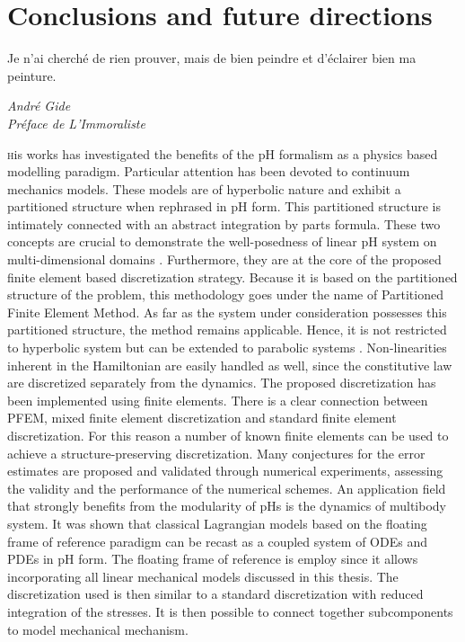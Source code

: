 \chapter*{Conclusions and future directions}

\epigraph{Je n’ai cherché de rien prouver, mais de bien peindre et d’éclairer bien ma peinture.}{\textit{André Gide \\ Préface de L'Immoraliste}}

\lettrine{\color{theme}{T}}his works has investigated the benefits of the pH formalism as a physics based modelling paradigm. Particular attention has been devoted to continuum mechanics models. These models are of hyperbolic nature and exhibit a partitioned structure when rephrased in  pH form. This partitioned structure is intimately connected with an abstract integration by parts formula. These two concepts are crucial to demonstrate the well-posedness of linear pH system on multi-dimensional domains \cite{skrepek2019wellposedness}. Furthermore, they are at the core of the proposed finite element based discretization strategy. Because it is based on the partitioned structure of the problem, this methodology goes under the name of Partitioned Finite Element Method. As far as the system under consideration possesses this partitioned structure, the method remains applicable. Hence, it is not restricted to  hyperbolic system but can be extended to parabolic systems \cite{serhani2019discretization}. Non-linearities inherent in the Hamiltonian are easily handled as well, since the constitutive law are discretized separately from the dynamics. The proposed discretization has been implemented using finite elements. There is a clear connection between PFEM, mixed finite element discretization and standard finite element discretization. For this reason a number of known finite elements can be used to achieve a structure-preserving discretization. Many conjectures for the error estimates are proposed and validated through numerical experiments, assessing the validity and the performance of the numerical schemes. An application field that strongly benefits from the modularity of pHs is the dynamics of multibody system. It was shown that classical Lagrangian models based on the floating frame of reference paradigm can be recast as a coupled system of ODEs and PDEs in pH form. The floating frame of reference is employ since it allows incorporating all linear mechanical models discussed in this thesis. The discretization used is then similar to a standard discretization with reduced integration of the stresses. It is then possible to connect together subcomponents to model mechanical mechanism.






